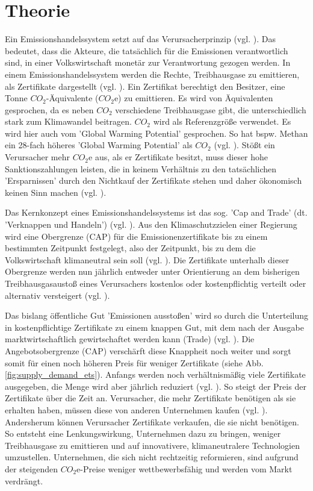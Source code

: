 \chapter{Theorie}

Ein Emissionshandelssystem setzt auf das Verursacherprinzip (vgl. \cite[S. 161]{hubert.2020}).
Das bedeutet, dass die Akteure, die tatsächlich für die Emissionen verantwortlich sind, in einer Volkswirtschaft monetär zur Verantwortung gezogen werden.
In einem Emissionshandelssystem werden die Rechte, Treibhausgase zu emittieren, als Zertifikate dargestellt (vgl. \cite[S. 27]{rabe.2018}).
Ein Zertifikat berechtigt den Besitzer, eine Tonne $CO_2$-Äquivalente ($CO_2$e) zu emittieren.
Es wird von Äquivalenten gesprochen, da es neben $CO_2$ verschiedene Treibhausgase gibt, die unterschiedlich stark zum Klimawandel beitragen. $CO_2$ wird als Referenzgröße verwendet.
Es wird hier auch vom 'Global Warming Potential' gesprochen. So hat bspw. Methan ein 28-fach höheres 'Global Warming Potential' als $CO_2$ (vgl. \cite{ub.2023}).
Stößt ein Verursacher mehr $CO_2$e aus, als er Zertifikate besitzt, muss dieser hohe Sanktionszahlungen leisten, die in keinem Verhältnis zu den tatsächlichen 'Ersparnissen' durch den Nichtkauf der Zertifikate stehen und daher ökonomisch keinen Sinn machen (vgl. \cite[S. 181]{hubert.2020}).

Das Kernkonzept eines Emissionshandelssystems ist das sog. 'Cap and Trade' (dt. 'Verknappen und Handeln') (vgl. \cite[S. 134]{rabe.2018}).
Aus den Klimaschutzzielen einer Regierung wird eine Obergrenze (CAP) für die Emissionenzertifikate bis zu einem bestimmten Zeitpunkt festgelegt, also der Zeitpunkt, bis zu dem die Volkswirtschaft klimaneutral sein soll (vgl. \cite[S. 181]{hubert.2020}).
Die Zertifikate unterhalb dieser Obergrenze werden nun jährlich entweder unter Orientierung an dem bisherigen Treibhausgasaustoß eines Verursachers kostenlos oder kostenpflichtig verteilt oder alternativ versteigert (vgl. \cite[S. 181]{hubert.2020}).

Das bislang öffentliche Gut 'Emissionen ausstoßen' wird so durch die Unterteilung in kostenpflichtige Zertifikate zu einem knappen Gut, mit dem nach der Ausgabe marktwirtschaftlich gewirtschaftet werden kann (Trade) (vgl. \cite[S. 17]{hubert.2020}).
Die Angebotsobergrenze (CAP) verschärft diese Knappheit noch weiter und sorgt somit für einen noch höheren Preis für weniger Zertifikate (siehe Abb. \ref{fig:supply_demand_ets}).
Anfangs werden noch verhältnismäßig viele Zertifikate ausgegeben, die Menge wird aber jährlich reduziert (vgl. \cite[S. 182]{hubert.2020}). So steigt der Preis der Zertifikate über die Zeit an.
Verursacher, die mehr Zertifikate benötigen als sie erhalten haben, müssen diese von anderen Unternehmen kaufen (vgl. \cite[S. 182]{hubert.2020}).
Andersherum können Verursacher Zertifikate verkaufen, die sie nicht benötigen.
So entsteht eine Lenkungswirkung, Unternehmen dazu zu bringen, weniger Treibhausgase zu emittieren und auf innovativere, klimaneutralere Technologien umzustellen.
Unternehmen, die sich nicht rechtzeitig reformieren, sind aufgrund der steigenden $CO_2$e-Preise weniger wettbewerbsfähig und werden vom Markt verdrängt.